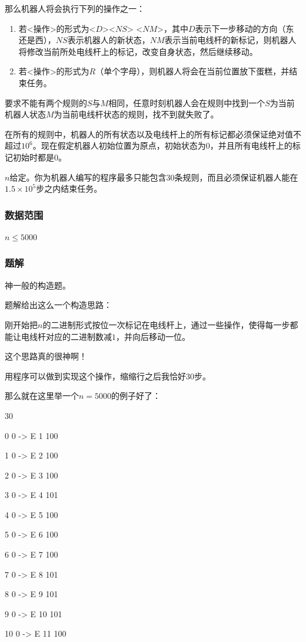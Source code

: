 \documentclass{ctexart}
\begin{document}
那么机器人将会执行下列的操作之一：
\begin{enumerate}
\item 若<操作>的形式为<$D$><$NS$> <$NM$>，其中$D$表示下一步移动的方向（东还是西），$NS$表示机器人的新状态，$NM$表示当前电线杆的新标记，则机器人将修改当前所处电线杆上的标记，改变自身状态，然后继续移动。
\item 若<操作>的形式为$R$（单个字母），则机器人将会在当前位置放下蛋糕，并结束任务。
\end{enumerate}

要求不能有两个规则的$S$与$M$相同，任意时刻机器人会在规则中找到一个$S$为当前机器人状态$M$为当前电线杆状态的规则，找不到就失败了。

在所有的规则中，机器人的所有状态以及电线杆上的所有标记都必须保证绝对值不超过$10^6$。现在假定机器人初始位置为原点，初始状态为$0$，并且所有电线杆上的标记初始时都是$0$。

$n$给定。你为机器人编写的程序最多只能包含$30$条规则，而且必须保证机器人能在$1.5 \times 10^5$步之内结束任务。
\subsubsection{数据范围}
$n \le 5000$
\subsubsection{题解}
神一般的构造题。

题解给出这么一个构造思路：

刚开始把$n$的二进制形式按位一次标记在电线杆上，通过一些操作，使得每一步都能让电线杆对应的二进制数减$1$，并向后移动一位。

这个思路真的很神啊！

用程序可以做到实现这个操作，缩缩行之后我恰好$30$步。

那么就在这里举一个$n=5000$的例子好了：

30

0 0 -> E 1 100

1 0 -> E 2 100

2 0 -> E 3 100

3 0 -> E 4 101

4 0 -> E 5 100

5 0 -> E 6 100

6 0 -> E 7 100

7 0 -> E 8 101

8 0 -> E 9 101

9 0 -> E 10 101

10 0 -> E 11 100
\end{document}
